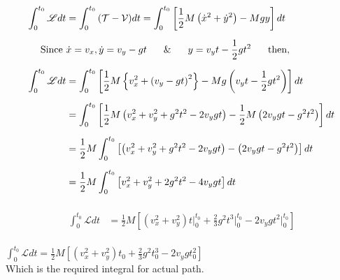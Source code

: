 \documentclass[12pt, a4paper]{article} %
\begin{document}
\begin{equation*}
    \begin{split}
        \int_{0}^{t_0}\mathscr{L} dt & = \int_{0}^{t_0}\mathcal{\left(T - V\right)} dt = \int_{0}^{t_0}\left[\frac{1}{2}M\left(\dot{x}^2 + \dot{y}^2\right) - Mgy\right]dt\\[2mm]
        \mbox{Since}\ & \dot{x} = v_x, \dot{y} = v_y - gt\hspace*{6mm} \&\hspace*{6mm} y = v_y t - \frac{1}{2}gt^2 \hspace*{6mm} \mbox{then},\\[2mm]
        \int_{0}^{t_0}\mathscr{L} dt & = \int_{0}^{t_0}\left[\frac{1}{2}M\left\{v^2_x + \left(v_y - gt\right)^2\right\} - Mg\left(v_y t - \frac{1}{2}gt^2\right)\right]dt\\[2mm]
        & = \int_{0}^{t_0}\left[\frac{1}{2}M\left(v^2_x + v^2_y + g^2t^2 - 2v_y gt\right) - \frac{1}{2}M\left(2v_y gt - g^2t^2\right)\right]dt\\[2mm]
        & = \frac{1}{2}M\int_{0}^{t_0}\left[\left(v^2_x + v^2_y + g^2t^2 - 2v_y gt\right) - \left(2v_y gt - g^2t^2\right)\right]dt\\[2mm]
        & = \frac{1}{2}M\int_{0}^{t_0}\left[v^2_x + v^2_y + 2g^2t^2 - 4v_y gt\right]dt\\[2mm]
    \end{split}
\end{equation*}

\begin{equation*}
    \begin{split}
        \int_{0}^{t_0}\mathscr{L} dt & = \frac{1}{2}M\left[\left(v^2_x + v^2_y\right)t\bigg|_{0}^{t_0} + \frac{2}{3}g^2t^3\bigg|_{0}^{t_0} - 2v_y gt^2\bigg|_{0}^{t_0}\right]\\[2mm]
    \end{split}
\end{equation*}
\begin{center}
    $\displaystyle \boxed{\int_{0}^{t_0}\mathscr{L} dt  = \frac{1}{2}M\left[\left(v^2_x + v^2_y\right)t_0 + \frac{2}{3}g^2t^3_0 - 2v_y gt^2_0\right]}$\\[4mm]
    Which is the required integral for actual path.
\end{center}

\BgThispage
\end{document}
